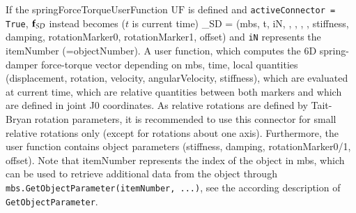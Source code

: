     If the springForceTorqueUserFunction $\mathrm{UF}$ is defined and \texttt{activeConnector = True}, 
	$\mathbf{f}_{SD}$ instead becomes ($t$ is current time)
    \be
      \fv_{SD} = (mbs, t, iN, , , , , 
	                         stiffness, damping, rotationMarker0, rotationMarker1, offset)
    \ee
    and \texttt{iN} represents the itemNumber (=objectNumber).
    A user function, which computes the 6D spring-damper force-torque vector depending on mbs, time, local quantities 
	(displacement, rotation, velocity, angularVelocity, stiffness), which are evaluated at current time, which are relative quantities between 
	both markers and which are defined in joint J0 coordinates. 
	As relative rotations are defined by Tait-Bryan rotation parameters, it is recommended to use this connector for small relative rotations only 
	(except for rotations about one axis).
	Furthermore, the user function contains object parameters (stiffness, damping, rotationMarker0/1, offset).
    Note that itemNumber represents the index of the object in mbs, which can be used to retrieve additional data from the object through
    \texttt{mbs.GetObjectParameter(itemNumber, ...)}, see the according description of \texttt{GetObjectParameter}.
    
